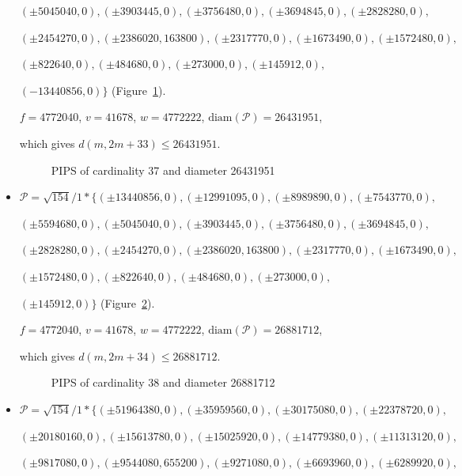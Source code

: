 \documentclass[12pt]{article}
\theoremstyle{theorem}
\theoremstyle{dfn}
\theoremstyle{remark}
\begin{document}
\begin{itemize}
$
(\pm 5045040, 0),
(\pm 3903445, 0),
(\pm 3756480, 0),
(\pm 3694845, 0),
(\pm 2828280, 0),
$

$
(\pm 2454270, 0),
(\pm 2386020, 163800),
(\pm 2317770, 0),
(\pm 1673490, 0),
(\pm 1572480, 0),
$

$
(\pm 822640, 0),
(\pm 484680, 0),
(\pm 273000, 0),
(\pm 145912, 0),
$

$
(-13440856, 0)\}
$
(Figure~\ref{picture_37.png}).

$f = 4772040$, $v = 41678$, $w = 4772222$, $\operatorname{diam(\mathcal{P})} = 26431951$,

which gives $d(m, 2m + 33) \leq 26431951$.


\begin{figure}[h!]
\parbox{1\linewidth}{\caption{PIPS of cardinality 37 and diameter 26431951}
\label{picture_37.png}}
\end{figure}


\item
$\mathcal{P}=\sqrt{154}/{1} * \{ (\pm 13440856, 0),
(\pm 12991095, 0),
(\pm 8989890, 0),
(\pm 7543770, 0),
$

$
(\pm 5594680, 0),
(\pm 5045040, 0),
(\pm 3903445, 0),
(\pm 3756480, 0),
(\pm 3694845, 0),
$

$
(\pm 2828280, 0),
(\pm 2454270, 0),
(\pm 2386020, 163800),
(\pm 2317770, 0),
(\pm 1673490, 0),
$

$
(\pm 1572480, 0),
(\pm 822640, 0),
(\pm 484680, 0),
(\pm 273000, 0),
$

$
(\pm 145912, 0)\}
$
(Figure~\ref{picture_38.png}).

$f = 4772040$, $v = 41678$, $w = 4772222$, $\operatorname{diam(\mathcal{P})} = 26881712$,

which gives $d(m, 2m + 34) \leq 26881712$.


\begin{figure}[h!]
\parbox{1\linewidth}{\caption{PIPS of cardinality 38 and diameter 26881712}
\label{picture_38.png}}
\end{figure}


\item
$\mathcal{P}=\sqrt{154}/{1} * \{ (\pm 51964380, 0),
(\pm 35959560, 0),
(\pm 30175080, 0),
(\pm 22378720, 0),
$

$
(\pm 20180160, 0),
(\pm 15613780, 0),
(\pm 15025920, 0),
(\pm 14779380, 0),
(\pm 11313120, 0),
$

$
(\pm 9817080, 0),
(\pm 9544080, 655200),
(\pm 9271080, 0),
(\pm 6693960, 0),
(\pm 6289920, 0),
$


\end{itemize}
\end{document}
